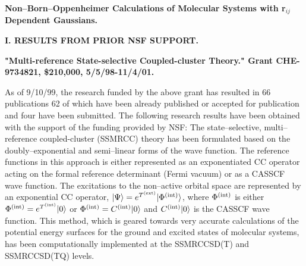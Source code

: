 \newpage



\setcounter{page}{1}

\begin{center}
{\Large \bf 
Non--Born--Oppenheimer Calculations of
Molecular Systems with r$_{ij}$ Dependent Gaussians.}

\end{center}


\vspace{2mm}

\noindent
{\bf I. RESULTS FROM PRIOR NSF SUPPORT.}


\noindent
{\bf "Multi-reference State-selective Coupled-cluster Theory."
Grant CHE-9734821, \$210,000, 5/5/98-11/4/01.} 


\vspace{3mm}

As of 9/10/99, the research funded by the above 
grant has resulted in 66 publications
\cite{A1,A2,A3,A4,A5,A6,A7,A8,%
A9,A10,A11,A12,A13,A14,A15,%
A16,A17,A18,%
A19,A20,A21,A22,A23,A24,A25,%
A26,A27,A28,A29,A30,A31,A32,A33,A34,%
A35,A36,A37,%
A38,A381,A382,%
A383,A384,A385,A3851,%
A3860,%
A3861,A3862,A3863,A3864,A3865,%
A3866,A3867,A3868,A3869,A3870,A3871,%
A3872,A3873,A3874,A3875,%
A3876,A3877,A3878,A3879,A3880,A3881}  
62 of which
have been already published or accepted for 
publication and four have been submitted.
The following research
results have been obtained with the support 
of the funding provided by NSF:
The state--selective, multi--reference coupled-cluster  
(SSMRCC) theory has been formulated based
on the doubly--exponential and semi--linear forms 
of the wave function.
The reference functions in this approach 
is either represented as 
an exponentiated CC operator  
acting on the formal reference determinant (Fermi vacuum)
or as a CASSCF wave function.
The excitations to the non--active orbital space 
are represented by an exponential CC
operator,
$|\Psi\rangle  = e^{T^{\rm (ext)}} | \Phi^{\rm (int)}
\rangle$, where $\Phi^{\rm (int)}$
is either 
$\Phi^{\rm (int)} = e^{T^{\rm (int)}} |0\rangle$ 
or 
$\Phi^{\rm (int)} = C^{\rm (int)} |0\rangle$ and
$C^{\rm (int)} |0\rangle$ is the CASSCF wave function.
This method,
which is geared towards very accurate calculations of
the potential energy surfaces for the ground and excited 
states of molecular systems,
has been computationally implemented at 
the SSMRCCSD(T) and SSMRCCSD(TQ) levels. 
  

\vspace{4mm}

